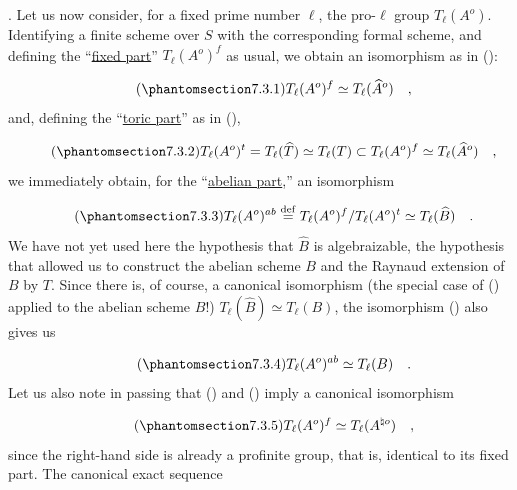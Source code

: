
\medskip
\noindent
{}. Let us now consider, for a fixed prime number $\ell$, the
pro-$\ell$ group $T_{\ell}(A^{o})$. Identifying a finite scheme over
$S$ with the corresponding formal scheme, and defining the
``\underline{fixed part}'' $T_{\ell}(A^{o})^{f}$ as usual, we obtain
an isomorphism as in ():

\begin{equation}\tag{\SGARefTarget{sga7.sga7i.eix.n7-3-1}{7.3.1}}
T_{\ell}(A^{o})^{f} \simeq T_{\ell}(\widehat{A}^{o}) \quad ,
\end{equation}
and, defining the ``\underline{toric part}'' as in (),

\begin{equation}\tag{\SGARefTarget{sga7.sga7i.eix.n7-3-2}{7.3.2}}
T_{\ell}(A^{o})^{t} = T_{\ell}(\widehat{T}) \simeq T_{\ell}(T)
 \subset T_{\ell}(A^{o})^{f} \simeq T_{\ell}(\widehat{A}^{o}) \quad ,
\end{equation}
we immediately obtain, for the ``\underline{abelian part},'' an
isomorphism

\begin{equation}\tag{\SGARefTarget{sga7.sga7i.eix.n7-3-3}{7.3.3}}
T_{\ell}(A^{o})^{ab} \stackrel{\mathrm{def}}{=}
T_{\ell}(A^{o})^{f}/T_{\ell}(A^{o})^{t}
 \simeq T_{\ell}(\widehat{B}) \quad .
\end{equation}
We have not yet used here the hypothesis that $\widehat B$ is
algebraizable, the hypothesis that allowed us to construct the
abelian scheme $B$ and the Raynaud extension of $B$ by $T$. Since
there is, of course, a canonical isomorphism (the special case of
() applied to the abelian scheme $B$!)
$T_{\ell}(\widehat B)\simeq T_{\ell}(B)$, the isomorphism ()
also gives us

\begin{equation}\tag{\SGARefTarget{sga7.sga7i.eix.n7-3-4}{7.3.4}}
T_{\ell}(A^{o})^{ab} \simeq T_{\ell}(B) \quad .
\end{equation}
Let us also note in passing that () and () imply a canonical
isomorphism

\begin{equation}\tag{\SGARefTarget{sga7.sga7i.eix.n7-3-5}{7.3.5}}
T_{\ell}(A^{o})^{f} \simeq T_{\ell}(A^{\natural o}) \quad ,
\end{equation}
since the right-hand side is already a profinite group, that is,
identical to its fixed part. The canonical exact sequence


